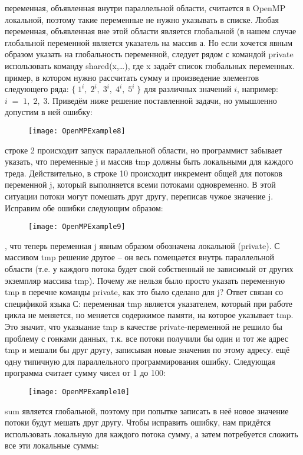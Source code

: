 {	 переменная, объявленная внутри параллельной области, считается в OpenMP локальной, поэтому такие переменные не нужно указывать в списке. Любая переменная, объявленная вне этой области является глобальной (в нашем случае глобальной переменной является указатель на массив а. Но если хочется явным образом указать на глобальность переменной, следует рядом с командой private использовать команду shared(x,\ldots), где x задаёт список глобальных переменных.
	 пример, в котором нужно рассчитать сумму и произведение элементов следующего ряда: $\{\;1^i,\;2^i,\;3^i,\;4^i,\;5^i\;\}$ для различных значений $i$, например: $i\;=\;1,\;2,\;3$. Приведём ниже решение поставленной задачи, но умышленно допустим в ней ошибку:
	\begin{figure}[H]
		\texttt{[image: OpenMPExample8]}
	\end{figure}
	 строке 2 происходит запуск параллельной области, но программист забывает указать, что переменные j и массив tmp должны быть локальными для каждого треда. Действительно, в строке 10 происходит инкремент общей для потоков переменной j, который выполняется всеми потоками одновременно. В этой ситуации потоки могут помешать друг другу, переписав чужое значение j. Исправим обе ошибки следующим образом:
	\begin{figure}[H]
		\texttt{[image: OpenMPExample9]}
	\end{figure}
	, что теперь переменная j явным образом обозначена локальной (private). С массивом tmp решение другое – он весь помещается внутрь параллельной области (т.е. у каждого потока будет свой собственный не зависимый от других экземпляр массива tmp). Почему же нельзя было просто указать переменную tmp в перечне команды private, как это было сделано для j? Ответ связан со спецификой языка С: переменная tmp является указателем, который при работе цикла не меняется, но меняется содержимое памяти, на которое указывает tmp. Это значит, что указыание tmp в качестве private-переменной не решило бы проблему с гонками данных, т.к. все потоки получили бы один и тот же адрес tmp и мешали бы друг другу, записывая новые значения по этому адресу.
	 ещё одну типичную для параллельного программирования ошибку. Следующая программа считает сумму чисел от 1 до 100:
	\begin{figure}[H]
		\texttt{[image: OpenMPExample10]}
	\end{figure}
	 sum является глобальной, поэтому при попытке записать в неё новое значение потоки будут мешать друг другу. Чтобы исправить ошибку, нам придётся использовать локальную для каждого потока сумму, а затем потребуется сложить все эти локальные суммы:
}

